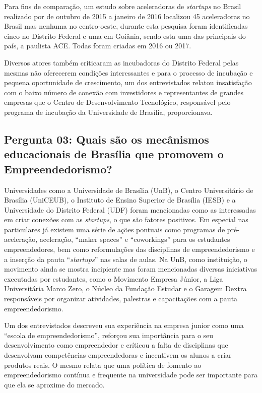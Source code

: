Para fins de comparação, um estudo sobre aceleradoras de \textit{startups} no Brasil realizado por  de outubro de 2015 a janeiro de 2016 localizou 45 aceleradoras no Brasil mas nenhuma no centro-oeste, durante esta pesquisa foram identificadas cinco no Distrito Federal e uma em Goiânia, sendo esta uma das principais do país, a paulista ACE. Todas foram criadas em 2016 ou 2017.

Diversos atores também criticaram as incubadoras do Distrito Federal pelas mesmas não oferecerem condições interessantes e para o processo de incubação e pequena oportunidade de crescimento, um dos entrevistados relatou insatisfação com o baixo número de conexão com investidores e representantes de grandes empresas que o Centro de Desenvolvimento Tecnológico, responsável pelo programa de incubação da Universidade de Brasília, proporcionava.

\subsection*{Pergunta 03: Quais são os mecânismos educacionais de Brasília que promovem o Empreendedorismo?}
\label{subsection:pergunta_de_pesquisa_3}

Universidades como a Universidade de Brasília (UnB), o Centro Universitário de Brasília (UniCEUB), o Instituto de Ensino Superior de Brasília (IESB) e a Universidade do Distrito Federal (UDF) foram mencionadas como as  interessadas em criar conexões com as \textit{startups}, o que são fatores positivos. Em especial nas particulares já existem uma série de ações pontuais como programas de pré-aceleração, aceleração, ``maker spaces'' e ``coworkings'' para os estudantes empreendedores, bem como reformulações das disciplinas de empreendedorismo e a inserção da pauta ``\textit{startups}'' nas salas de aulas. Na UnB, como instituição, o movimento ainda se mostra incipiente mas foram mencionadas diversas iniciativas executadas por estudantes, como o Movimento Empresa Júnior, a Liga Universitária Marco Zero, o Núcleo da Fundação Estudar e o Garagem Dextra responsáveis por organizar atividades, palestras e capacitações com a pauta empreendedorismo. 

Um dos entrevistados descreveu sua experiência na empresa junior como uma ``escola de empreendedorismo'', reforçou sua importância para o seu desenvolvimento como empreendedor e críticou a falta de disciplinas que desenvolvam competências empreendedoras e incentivem os alunos a criar produtos reais. O mesmo relata que uma política de fomento ao empreendedorismo contínua e frequente na universidade pode ser importante para que ela se aproxime do mercado. 

